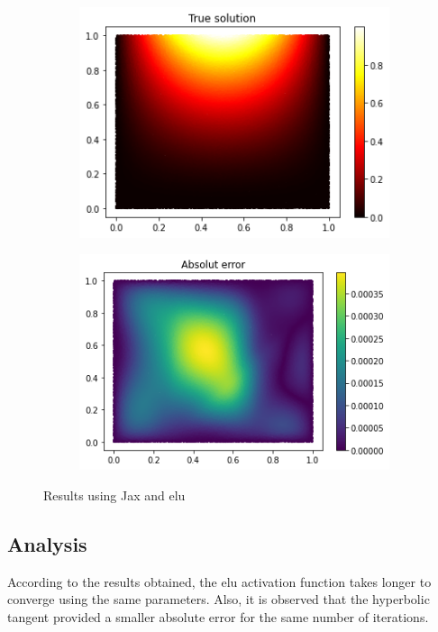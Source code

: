 \begin{figure}[H]
\begin{subfigure}{.45\textwidth}
    \includegraphics[width=.8\linewidth]{images/NN_Jax_PDE8_files_elu/NN_Jax_PDE8_22_0.png}
    \label{fig:sub3}
    \end{subfigure}
\begin{subfigure}{.45\textwidth}
    \centering
    \includegraphics[width=.8\linewidth]{images/NN_Jax_PDE8_files_elu/NN_Jax_PDE8_24_0.png}
    \label{fig:sub4}
\end{subfigure}
\caption{Results using Jax and elu}
\label{fig:test}
\end{figure}

\vspace{-0.5cm}
\subsection{Analysis}
According to the results obtained, the elu activation function takes longer to converge using the same parameters. Also, it is observed that the hyperbolic tangent provided a smaller absolute error for the same number of iterations.
\newpage

